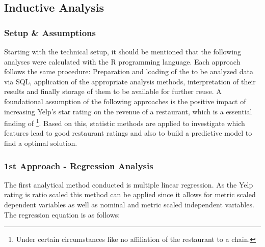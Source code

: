 \subsection{Inductive Analysis}
\label{subsec:analysis}


\subsubsection{Setup \& Assumptions}
Starting with the technical setup, it should be mentioned that the following analyses were calculated with the R programming language. Each approach follows the same procedure: Preparation and loading of the to be analyzed data via SQL, application of the appropriate analysis methods, interpretation of their results and finally storage of them to be available for further reuse.\newline
A foundational assumption of the following approaches is the positive impact of increasing Yelp's star rating on the revenue of a restaurant, which is a essential finding of \cite{CaseOfYelp}\footnote{Under certain circumstances like no affiliation of the restaurant to a chain.}. Based on this, statistic methods are applied to investigate which features lead to good restaurant ratings and also to build a predictive model to find a optimal solution.


\subsubsection{1st Approach -  Regression Analysis}
The first analytical method conducted is multiple linear regression. As the Yelp rating is ratio scaled this method can be applied since it allows for metric scaled dependent variables as well as nominal and metric scaled independent variables. The regression equation is as follows:

